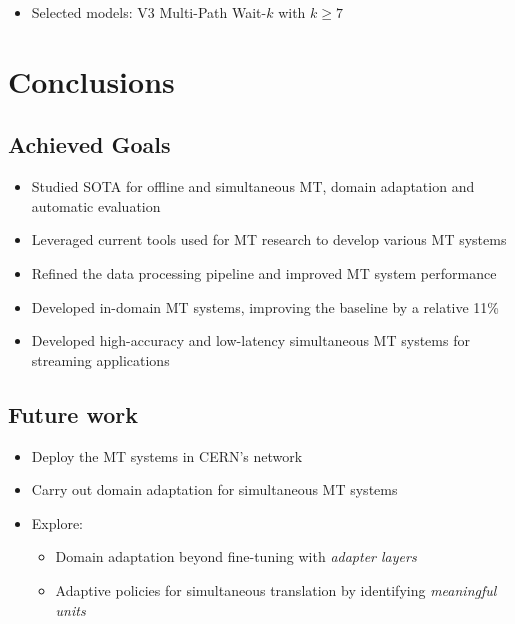 \documentclass[landscape]{article}
\begin{document}
\begin{itemize}
	\item Selected models: V3 Multi-Path Wait-$k$ with $k \geq 7$
\end{itemize}
\begin{table}[ht]
\centering
{}
\end{table}


\cp
\section{Conclusions}
\vspace*{10mm}
\subsection*{Achieved Goals}
\begin{itemize}\itemsep=5mm
	\item Studied SOTA for offline and simultaneous MT, domain adaptation and automatic evaluation
	\item Leveraged current tools used for MT research to develop various MT systems
	\item Refined the data processing pipeline and improved MT system performance
	\item Developed in-domain MT systems, improving the baseline by a relative 11\%
	\item Developed high-accuracy and low-latency simultaneous MT systems for streaming applications
\end{itemize}

\subsection*{Future work}
\begin{itemize}\itemsep=5mm
	\item Deploy the MT systems in CERN's network
	\item Carry out domain adaptation for simultaneous MT systems
	\item Explore:
	\begin{itemize}
		\item Domain adaptation beyond fine-tuning with \textit{adapter layers}
		\item Adaptive policies for simultaneous translation by identifying \textit{meaningful units}
	\end{itemize}	
\end{itemize}
\end{document}
